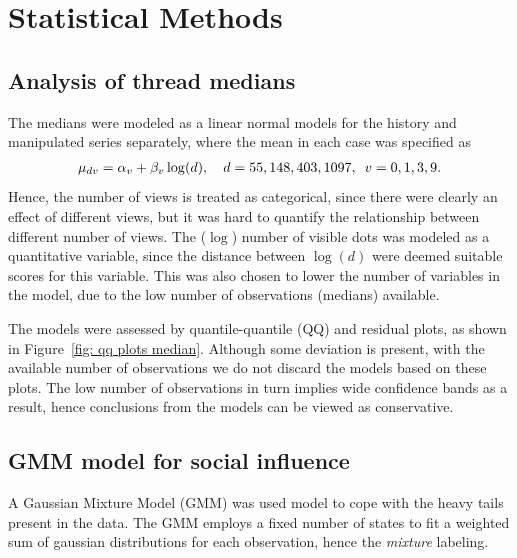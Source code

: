 \documentclass[9pt,twoside,lineno]{pnas-new}
\begin{document}
\section*{Statistical Methods}
\subsection*{Analysis of thread medians}
The medians were modeled as a linear normal models for the history and manipulated series separately, where the mean in each case was specified as
\begin{align*}
	\mu_{dv} = \alpha_v+\beta_v\log(d), \quad d=55, 148, 403, 1097, \enskip v=0,1,3,9 .
\end{align*}
Hence, the number of views is treated as categorical, since there were clearly an effect of different views, but it was hard to quantify the relationship between different number of views. The ($\log$) number of visible dots was modeled as a quantitative variable, since the distance between $\log(d)$ were deemed suitable scores for this variable. This was also chosen to lower the number of variables in the model, due to the low number of observations (medians) available. 

The models were assessed by quantile-quantile (QQ) and residual plots, as shown in Figure~\ref{fig: qq plots median}. Although some deviation is present, with the available number of observations we do not discard the models based on these plots. The low number of observations in turn implies wide confidence bands as a result, hence conclusions from the models can be viewed as conservative. 

\subsection*{GMM model for social influence}
A Gaussian Mixture Model (GMM) was used model to cope with the heavy tails present in the data. The GMM employs a fixed number of states to fit a weighted sum of gaussian distributions for each observation, hence the \emph{mixture} labeling.
\end{document}
